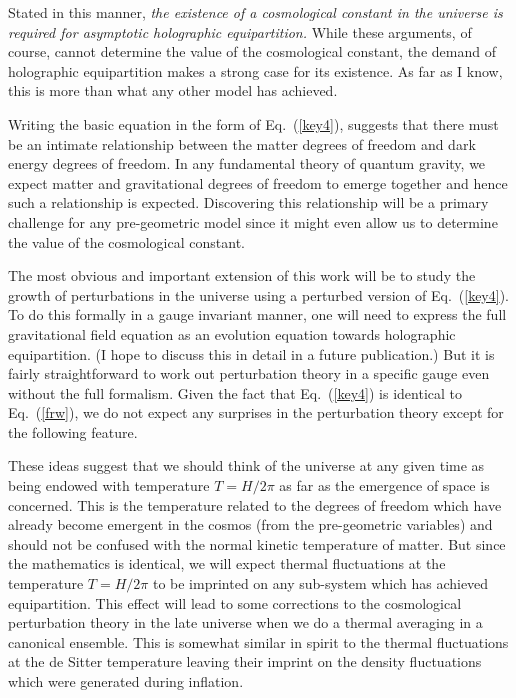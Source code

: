 \documentclass[aps,prd,showpacs,nofootinbib,floats,floatfix,preprintnumbers,groupedaddress,twocolumn]{revtex4}
\def\eq#1{{Eq.~(\ref{#1})}}
\begin{document}
Stated in this manner, \textit{the existence of a cosmological constant in the universe is required for asymptotic holographic equipartition.}  While these arguments, of course, cannot determine the value of the cosmological constant, the demand of holographic equipartition makes a strong case for its existence. As far as I know, this is more than what any other model has achieved.

Writing the basic equation in the form of \eq{key4}, suggests that there must be an intimate relationship between the matter degrees of freedom and dark energy degrees of freedom. In any fundamental theory of quantum gravity, we expect matter and gravitational degrees of freedom to emerge together and hence such a relationship is expected. 
Discovering this relationship will be a primary challenge for any pre-geometric model since it might even allow us to determine the value of the cosmological constant.




The most obvious and important extension of this work will be to study the growth of perturbations in the universe using a perturbed version of \eq{key4}. To do this formally in a gauge invariant manner, one will need to express the full gravitational field equation as an evolution equation towards holographic equipartition. (I hope to discuss this in detail in a future publication.) But it is fairly straightforward to work out perturbation theory in a specific gauge even without the full formalism. Given the fact that \eq{key4} is identical to \eq{frw}, we do not expect any  surprises in the perturbation theory except for the following feature.

These ideas suggest that we should think of the universe at any given time as being endowed with temperature $T= H/2\pi$ as far as the emergence of space is concerned. This is the temperature related to the degrees of freedom which have already become emergent in the cosmos (from the pre-geometric variables) and should not be confused with the normal kinetic temperature of matter. But since the mathematics is identical, we will expect thermal fluctuations at the temperature $T=H/2\pi$ to be imprinted on any sub-system which has achieved equipartition. This effect will lead to some corrections to the cosmological perturbation theory in the late universe when we do a thermal averaging in a canonical ensemble. This is somewhat similar in spirit to the thermal fluctuations at the de Sitter temperature leaving their imprint on the density fluctuations which were generated during inflation.
\end{document}
